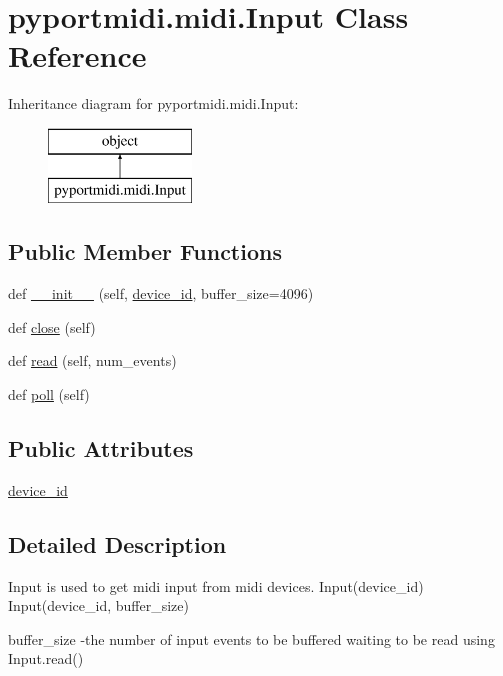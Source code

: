\hypertarget{classpyportmidi_1_1midi_1_1_input}{}\section{pyportmidi.\+midi.\+Input Class Reference}
\label{classpyportmidi_1_1midi_1_1_input}
Inheritance diagram for pyportmidi.\+midi.\+Input\+:\begin{figure}[H]
\begin{center}
\leavevmode
\includegraphics[height=2.000000cm]{classpyportmidi_1_1midi_1_1_input}
\end{center}
\end{figure}
\subsection*{Public Member Functions}
\begin{DoxyCompactItemize}
\item 
def \hyperlink{classpyportmidi_1_1midi_1_1_input_a1e5682d3a18d1bbe578dad6b3e045296}{\+\_\+\+\_\+init\+\_\+\+\_\+} (self, \hyperlink{classpyportmidi_1_1midi_1_1_input_a4222850ca83a04bc75ac5549caa5644c}{device\+\_\+id}, buffer\+\_\+size=4096)
\item 
def \hyperlink{classpyportmidi_1_1midi_1_1_input_aff3fbfe86e2e82ba102734bec02c2fa3}{close} (self)
\item 
def \hyperlink{classpyportmidi_1_1midi_1_1_input_aa7a889e8dbc30eb8e0494d6fc58ab2f0}{read} (self, num\+\_\+events)
\item 
def \hyperlink{classpyportmidi_1_1midi_1_1_input_ae2c00007ab7f18aae52f4250049e2aec}{poll} (self)
\end{DoxyCompactItemize}
\subsection*{Public Attributes}
\begin{DoxyCompactItemize}
\item 
\hyperlink{classpyportmidi_1_1midi_1_1_input_a4222850ca83a04bc75ac5549caa5644c}{device\+\_\+id}
\end{DoxyCompactItemize}


\subsection{Detailed Description}
\begin{DoxyVerb}Input is used to get midi input from midi devices.
Input(device_id)
Input(device_id, buffer_size)

buffer_size -the number of input events to be buffered waiting to 
  be read using Input.read() 
\end{DoxyVerb}
 

